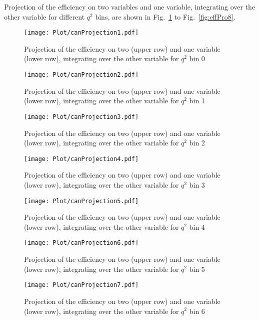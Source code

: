 Projection of the efficiency on two variables and one variable,
integrating over the other variable for different $q^2$ bins, are
shown in Fig.~\ref{fig:effPro0} to Fig.~\ref{fig:effPro8}.

\begin{figure}[hbt]
    \texttt{[image: Plot/canProjection1.pdf]}
    \caption{Projection of the efficiency on two (upper row) and one variable (lower row), integrating over the other variable for $q^2$ bin 0}
    \label{fig:effPro0}
\end{figure}

\begin{figure}[hbt]
    \texttt{[image: Plot/canProjection2.pdf]}
    \caption{Projection of the efficiency on two (upper row) and one variable (lower row), integrating over the other variable for $q^2$ bin 1}
    \label{fig:effPro1}
\end{figure}

\begin{figure}[hbt]
    \texttt{[image: Plot/canProjection3.pdf]}
    \caption{Projection of the efficiency on two (upper row) and one variable (lower row), integrating over the other variable for $q^2$ bin 2}
    \label{fig:effPro2}
\end{figure}

\begin{figure}[hbt]
    \texttt{[image: Plot/canProjection4.pdf]}
    \caption{Projection of the efficiency on two (upper row) and one variable (lower row), integrating over the other variable for $q^2$ bin 3}
    \label{fig:effPro3}
\end{figure}

\begin{figure}[hbt]
    \texttt{[image: Plot/canProjection5.pdf]}
    \caption{Projection of the efficiency on two (upper row) and one variable (lower row), integrating over the other variable for $q^2$ bin 4}
    \label{fig:effPro4}
\end{figure}

\begin{figure}[hbt]
    \texttt{[image: Plot/canProjection6.pdf]}
    \caption{Projection of the efficiency on two (upper row) and one variable (lower row), integrating over the other variable for $q^2$ bin 5}
    \label{fig:effPro5}
\end{figure}

\begin{figure}[hbt]
    \texttt{[image: Plot/canProjection7.pdf]}
    \caption{Projection of the efficiency on two (upper row) and one variable (lower row), integrating over the other variable for $q^2$ bin 6}
    \label{fig:effPro6}
\end{figure}

